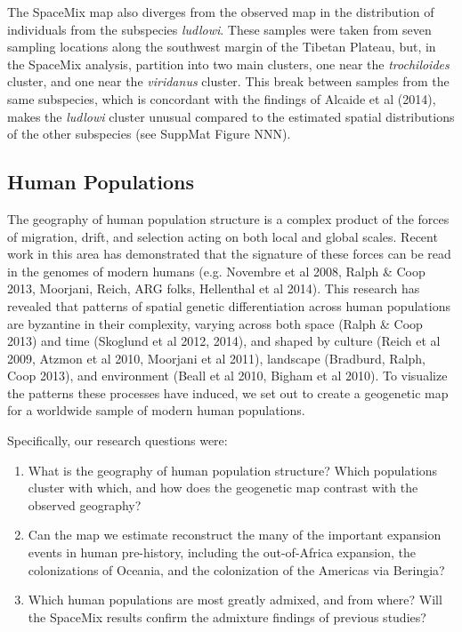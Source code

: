 \documentclass[12pt]{article}
\begin{document}
The SpaceMix map also diverges from the observed map in the distribution of individuals from the subspecies \textit{ludlowi}.  These samples were taken from seven sampling locations along the southwest margin of the Tibetan Plateau, but, in the SpaceMix analysis, partition into two main clusters, one near the \textit{trochiloides} cluster, and one near the \textit{viridanus} cluster.  This break between samples from the same subspecies, which is concordant with the findings of Alcaide et al (2014), makes the \textit{ludlowi} cluster unusual compared to the estimated spatial distributions of the other subspecies (see SuppMat Figure NNN).

%
\subsection*{Human Populations}
The geography of human population structure is a complex product of the forces of migration, drift, and selection acting on both local and global scales.  Recent work in this area has demonstrated that the signature of these forces can be read in the genomes of modern humans (e.g. Novembre et al 2008, Ralph \& Coop 2013, Moorjani, Reich, ARG folks, Hellenthal et al 2014).  This research has revealed that patterns of spatial genetic differentiation across human populations are byzantine in their complexity, varying across both space (Ralph \& Coop 2013) and time (Skoglund et al 2012, 2014), and shaped by culture (Reich et al 2009, Atzmon et al 2010, Moorjani et al 2011), landscape (Bradburd, Ralph, Coop 2013), and environment (Beall et al 2010, Bigham et al 2010).  To visualize the patterns these processes have induced, we set out to create a geogenetic map for a worldwide sample of modern human populations.  

Specifically, our research questions were: 
\begin{enumerate}
\item What is the geography of human population structure?  Which populations cluster with which, and how does the geogenetic map contrast with the observed geography?
\item Can the map we estimate reconstruct the many of the important expansion events in human pre-history, including the out-of-Africa expansion, the colonizations of Oceania, and the colonization of the Americas via Beringia?
\item Which human populations are most greatly admixed, and from where?  Will the SpaceMix results confirm the admixture findings of previous studies?
\end{enumerate}
\end{document}
